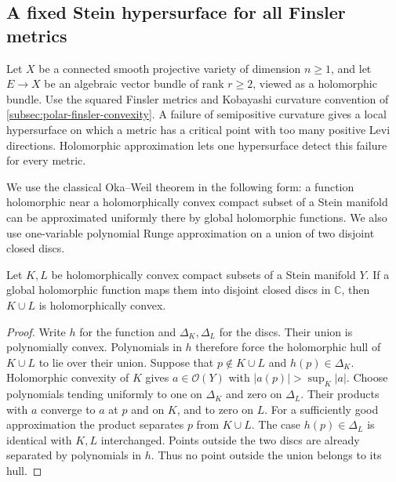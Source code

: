 \subsection{A fixed Stein hypersurface for all Finsler metrics}
\label{subsec:fixed-stein-finsler-hypersurface}

Let $X$ be a connected smooth projective variety of dimension $n\geq1$,
and let $E\to X$ be an algebraic vector bundle of rank $r\geq2$,
viewed as a holomorphic bundle. Use the squared Finsler metrics and
Kobayashi curvature convention of \cref{subsec:polar-finsler-convexity}.
A failure of semipositive curvature gives a local hypersurface on which
a metric has a critical point with too many positive Levi directions.
Holomorphic approximation lets one hypersurface detect this failure
for every metric.

We use the classical Oka--Weil theorem in the following form:
a function holomorphic near a holomorphically convex compact subset
of a Stein manifold can be approximated uniformly there by global
holomorphic functions. We also use one-variable polynomial Runge
approximation on a union of two disjoint closed discs.

\begin{lemma}\label{lem:separated-holomorphic-convex-compacts}
Let $K,L$ be holomorphically convex compact subsets of a Stein manifold
$Y$. If a global holomorphic function maps them into disjoint closed
discs in $\mathbb C$, then $K\cup L$ is holomorphically convex.
\end{lemma}
\begin{proof}
Write $h$ for the function and $\Delta_K,\Delta_L$ for the discs.
Their union is polynomially convex. Polynomials in $h$ therefore force
the holomorphic hull of $K\cup L$ to lie over their union.
Suppose that $p\notin K\cup L$ and $h(p)\in\Delta_K$.
Holomorphic convexity of $K$ gives $a\in\mathcal O(Y)$ with
$|a(p)|>\sup_K|a|$. Choose polynomials tending uniformly to one on
$\Delta_K$ and zero on $\Delta_L$. Their products with $a$ converge
to $a$ at $p$ and on $K$, and to zero on $L$.
For a sufficiently good approximation the product separates $p$
from $K\cup L$. The case $h(p)\in\Delta_L$ is identical with $K,L$
interchanged. Points outside the two discs are already separated by
polynomials in $h$. Thus no point outside the union belongs to its hull.
\end{proof}

